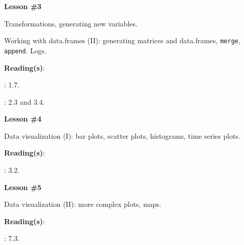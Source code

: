 \documentclass[letterpaper]{article}
\renewenvironment{itemize}{
  \begin{list}{}{
    \setlength{\leftmargin}{1.5em}
  }
}{
  \end{list}
}
\begin{document}
\begin{enumerate}
			\begin{itemize} 
				\item[$\bullet$] {\bf Lesson \#3}
					\begin{itemize} 
				\item[$\circ$] Transformations, generating new variables.
				\item[$\circ$] Working with data.frames (II): generating matrices and data.frames, \texttt{merge}, \texttt{append}. Logs.  %
        \item[$\circ$] {\bf Reading(s)}: 
          \begin{itemize}
            \item[$\diamond$] \textcite{Gill:2006wp}: 1.7.
            \item[$\diamond$] \textcite{Fox:2010vc}: 2.3 and 3.4.
          \end{itemize}
					\end{itemize}
			\end{itemize}




			\begin{itemize} 
				\item[$\bullet$] {\bf Lesson \#4}
					\begin{itemize} 
						\item[$\circ$] Data visualization (I): bar plots, scatter plots, histograms, time series plots. %
						\item[$\circ$] {\bf Reading(s)}:
							\begin{itemize}
								\item[$\diamond$] \textcite{Fox:2010vc}: 3.2.
							\end{itemize}
					\end{itemize}
			\end{itemize}



			\begin{itemize} 
				\item[$\bullet$] {\bf Lesson \#5}
					\begin{itemize} 
				\item[$\circ$] Data visualization (II): more complex plots, maps.
				\item[$\circ$] {\bf Reading(s)}: 
					\begin{itemize}
						\item[$\diamond$] \textcite{Fox:2010vc}: 7.3.
					\end{itemize}
					\end{itemize}
			\end{itemize}



\end{enumerate}
\end{document}
